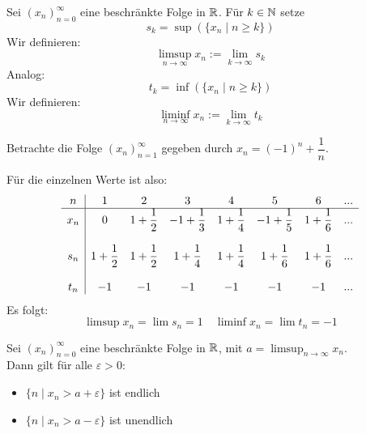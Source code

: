 \documentclass[main.tex]{subfiles}
\begin{document}
\begin{Definition}[Limsup]
  Sei $(x_n)_{n=0}^\infty$ eine beschränkte Folge in $\mathbb{R}$. Für $k \in \mathbb{N}$ setze
  $$s_k = \sup(\{ x_n \mid n \geq k\})$$
  Wir definieren:
  $$\limsup_{n\to \infty} x_n := \lim \limits_{k \to \infty} s_k$$
  Analog:
  $$t_k = \inf(\{ x_n \mid n \geq k\})$$
  Wir definieren:
  $$\liminf_{n\to \infty} x_n := \lim \limits_{k \to \infty} t_k$$
\end{Definition}

\begin{Beispiel}
  Betrachte die Folge $(x_n)_{n=1}^\infty$ gegeben durch $x_n = (-1)^n + \dfrac{1}{n}$.

  \begin{center}
  \end{center}
  Für die einzelnen Werte ist also:
  $$\begin{array}{c|c c c c c c c}
    n & 1 & 2 & 3 & 4 & 5 & 6 & ... \\
    \hline
    x_n & 0 & 1+\dfrac{1}{2} & -1+\dfrac{1}{3} & 1+\dfrac{1}{4} & -1+\dfrac{1}{5} & 1+\dfrac{1}{6} & ... \\
    \\
    s_n & 1+\dfrac{1}{2} & 1+\dfrac{1}{2} & 1+\dfrac{1}{4} & 1+\dfrac{1}{4} & 1+\dfrac{1}{6} & 1+\dfrac{1}{6} & ... \\
    \\
    t_n & -1 & -1 & -1 & -1 & -1 & -1 & ... \\
  \end{array}$$
  Es folgt:
  $$\limsup x_n = \lim s_n = 1 \quad \liminf x_n = \lim t_n = -1$$
\end{Beispiel}

\begin{Theorem}
  Sei $(x_n)_{n=0}^\infty$ eine beschränkte Folge in $\mathbb{R}$, mit $a = \limsup_{n\to \infty} x_n$.\\
  Dann gilt für alle $\varepsilon > 0$:
  \begin{itemize}
    \item $\{n \mid x_n > a + \varepsilon \}$ ist endlich
    \item $\{n \mid x_n > a - \varepsilon \}$ ist unendlich
  \end{itemize}
\end{Theorem}
\end{document}
